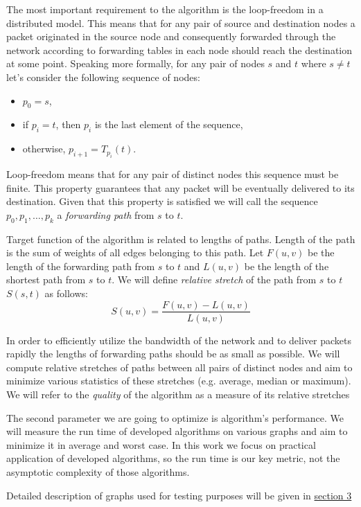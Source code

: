 The most important requirement to the algorithm is the loop-freedom in a distributed model. This means that for any pair of source and destination nodes a packet originated in the source node and consequently forwarded through the network according to forwarding tables in each node should reach the destination at some point. Speaking more formally, for any pair of nodes $s$ and $t$ where $s \neq t$ let's consider the following sequence of nodes:
\begin{itemize}
\item $p_0 = s$,
\item if $p_i = t$, then $p_i$ is the last element of the sequence,
\item otherwise, $p_{i + 1} = T_{p_i}(t)$.
\end{itemize}

Loop-freedom means that for any pair of distinct nodes this sequence must be finite. This property guarantees that any packet will be eventually delivered to its destination. Given that this property is satisfied we will call the sequence $p_0, p_1, \ldots, p_k$ a \textit{forwarding path} from $s$ to $t$.

Target function of the algorithm is related to lengths of paths. Length of the path is the sum of weights of all edges belonging to this path. Let $F(u, v)$ be the length of the forwarding path from $s$ to $t$ and $L(u, v)$ be the length of the shortest path from $s$ to $t$. We will define \textit{relative stretch} of the path from $s$ to $t$ $S(s, t)$ as follows:
$$S(u, v) = \frac{F(u, v) - L(u, v)}{L(u, v)}$$

In order to efficiently utilize the bandwidth of the network and to deliver packets rapidly the lengths of forwarding paths should be as small as possible. We will compute relative stretches of paths between all pairs of distinct nodes and aim to minimize various statistics of these stretches (e.g. average, median or maximum). We will refer to the \textit{quality} of the algorithm as a measure of its relative stretches

The second parameter we are going to optimize is algorithm's performance. We will measure the run time of developed algorithms on various graphs and aim to minimize it in average and worst case. In this work we focus on practical application of developed algorithms, so the run time is our key metric, not the asymptotic complexity of those algorithms.

Detailed description of graphs used for testing purposes will be given in \hyperref[sec:testing]{section 3}
